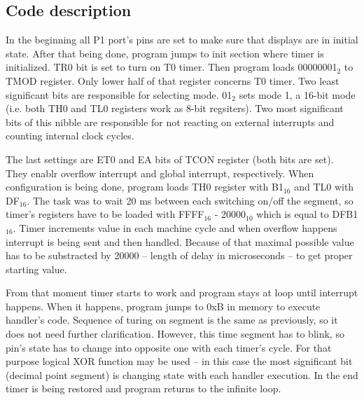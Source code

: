 \documentclass{article}
\begin{document}
\rmfamily
\subsection{Code description}
In the beginning all P1 port's pins are set to make sure that displays are in initial state.
After that being done, program jumps to init section where timer is initialized. TR0 bit is set
to turn on T0 timer. Then program loads 00000001$_2$ to TMOD register. Only lower half of that register
concerns T0 timer. Two least significant bits are responsible for selecting mode. 01$_2$ sets mode 1, 
a 16-bit mode (i.e. both TH0 and TL0 registers work as 8-bit regsiters). Two most significant bits of this nibble
are responsible for not reacting on external interrupts and counting internal clock cycles.

The last settings are ET0 and EA bits of TCON register (both bits are set). They enablr overflow interrupt and
global interrupt, respectively. When configuration is being done, program loads TH0 register with B1$_{16}$
and TL0 with DF$_{16}$. The task was to wait 20 ms between each switching on/off the segment, so timer's registers
have to be loaded with FFFF$_{16}$ - 20000$_{10}$ which is equal to DFB1$_{16}$. Timer increments value in each machine cycle
and when overflow happens interrupt is being sent and then handled. Because of that maximal possible value has to be
substracted by 20000 -- length of delay in microseconds -- to get proper starting value.

From that moment timer starts to work and program stays at loop until interrupt happens. When it happens, program jumps
to 0xB in memory to execute handler's code. Sequence of turing on segment is the same as previously, so it does not need
further clarification. However, this time segment has to blink, so pin's state has to change into opposite one with each
timer's cycle. For that purpose logical XOR function may be used -- in this case the most significant bit (decimal point segment) is changing state
with each handler execution. In the end timer is being restored and program returns to the infinite loop.
\end{document}

